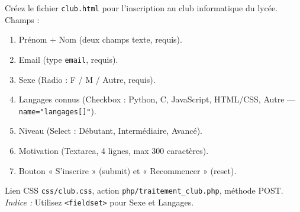 \documentclass[11pt]{article}
\begin{document}
\begin{exercice}
Créez le fichier \texttt{club.html} pour l'inscription au club informatique du lycée. Champs :
\begin{enumerate}
    \item Prénom + Nom (deux champs texte, requis).
    \item Email (type \texttt{email}, requis).
    \item Sexe (Radio : F / M / Autre, requis).
    \item Langages connus (Checkbox : Python, C, JavaScript, HTML/CSS, Autre — \texttt{name="langages[]"}).
    \item Niveau (Select : Débutant, Intermédiaire, Avancé).
    \item Motivation (Textarea, 4 lignes, max 300 caractères).
    \item Bouton « S'inscrire » (submit) et « Recommencer » (reset).
\end{enumerate}
Lien CSS \texttt{css/club.css}, action \texttt{php/traitement\_club.php}, méthode POST.
\textit{Indice :} Utilisez \texttt{<fieldset>} pour Sexe et Langages.
\end{exercice}
\end{document}
